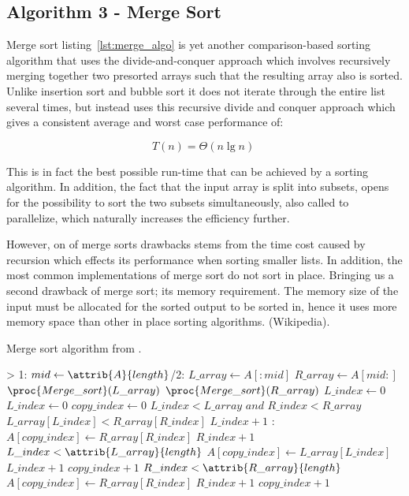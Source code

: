 \documentclass[sigconf, nonacm, natbib, screen, balance=False]{acmart}
\begin{document}
\subsection{Algorithm 3 - Merge Sort}\label{sec:algo3}

Merge sort listing~\ref{lst:merge_algo} is yet another comparison-based sorting algorithm that uses the divide-and-conquer approach which involves recursively merging together two presorted arrays such that the resulting array also is sorted. Unlike insertion sort and bubble sort it does not iterate through the entire list several times, but instead uses this recursive divide and conquer approach which gives a consistent average and worst case performance of: 

\begin{equation}
  T(n) = \Theta(n\lg n) \;  \label{eq:merge_sort_best}
\end{equation}

This is in fact the best possible run-time that can be achieved by a sorting algorithm. In addition, the fact that the input array is split into subsets, opens for the possibility to sort the two subsets simultaneously, also called to parallelize, which naturally increases the efficiency further.

However, on of merge sorts drawbacks stems from the time cost caused by recursion which effects its performance when sorting smaller lists. In addition, the most common implementations of merge sort do not sort in place. Bringing us a second drawback of merge sort; its memory requirement. The memory size of the input must be allocated for the sorted output to be sorted in, hence it uses more memory space than other in place sorting algorithms. (Wikipedia). 

\begin{listing}
  \caption{Merge sort algorithm from \citet[Ch.~2.1]{CLRS_2009}.}
  \label{lst:merge_algo}

  \begin{codebox}
    \li \If {} > 1: 
    \li \Do
    $mid \gets \attrib{A}{length}$/2: 
    \li $L\_array\gets A[:mid]$
    \li $R\_array\gets A[mid:]$
    \li $\proc{Merge\_sort}(L\_array)$
    \li $\proc{Merge\_sort}(R\_array)$
    \li $L\_index\gets 0$
    \li $L\_index\gets 0$
    \li $copy\_index\gets 0$
    \li \While $L\_index < L\_array$ $and$ $R\_index < R\_array$ 
    \li \Do
    \If $L\_array[L\_index] < R\_array[R\_index]$
    \li \Do
    $L\_index + 1$
    \li \Else:
    \li $A[copy\_index] \gets R\_array[R\_index]$
    \li $R\_index + 1$
    \End
    \End
    \li \While $L\_index < \attrib{L\_array}{length}$
    \li \Do
    $A[copy\_index] \gets L\_array[L\_index]$
    \li $L\_index + 1$
    \li $copy\_index + 1$
    \End
    \li \While $R\_index < \attrib{R\_array}{length}$
    \li \Do
    $A[copy\_index] \gets R\_array[R\_index]$
    \li $R\_index + 1$
    \li $copy\_index + 1$    
  \end{codebox}
\end{listing}
\end{document}
